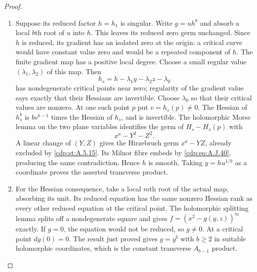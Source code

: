 \begin{proof}
\begin{enumerate}[label={$\langle1\rangle$\arabic*.},leftmargin=*]
\item Suppose its reduced factor $h=h_1$ is singular.
Write $g=u h^b$ and absorb a local $b$th root of
$u$ into $h$. This leaves its reduced zero germ
unchanged. Since $h$ is reduced, its gradient
has an isolated zero at the origin: a critical
curve would have constant value zero and would
be a repeated component of $h$. The finite
gradient map has a positive local degree.
Choose a small regular value
$(\lambda_1,\lambda_2)$ of this map. Then
\[
        h_s=h-\lambda_1y-\lambda_2z-\lambda_0
\]
has nondegenerate critical points near zero;
regularity of the gradient value says exactly
that their Hessians are invertible. Choose
$\lambda_0$ so that their critical values are
nonzero. At one such point $p$ put
$v=h_s(p)\ne0$. The Hessian of $h_s^b$ is
$b v^{b-1}$ times the Hessian of $h_s$, and
is invertible. The holomorphic Morse lemma on
the two plane variables identifies the germ of
$H_s-H_s(p)$ with
\[
                         x^a-Y^2-Z^2.
\]
A linear change of $(Y,Z)$ gives the Hirzebruch
germ $x^a-YZ$, already excluded by \ref{cdp:st:A.5.15}.
Its Milnor fibre embeds by \eqref{cdp:eq:A.J.40}, producing
the same contradiction. Hence $h$ is smooth.
Taking $y=h u^{1/b}$ as a coordinate proves the
asserted transverse product.

\item For the Hessian consequence, take a local $m$th
root of the actual map, absorbing its unit.
Its reduced equation has the same nonzero
Hessian rank as every other reduced equation
at the critical point. The holomorphic splitting
lemma splits off a nondegenerate square and
gives $f=(x^2-g(y,z))^m$ exactly. If $g=0$,
the equation would not be reduced, so $g\ne0$.
At a critical point $dg(0)=0$. The result just
proved gives $g=y^b$ with $b\ge2$ in suitable
holomorphic coordinates, which is the constant
transverse $A_{b-1}$ product.

\end{enumerate}
\end{proof}
